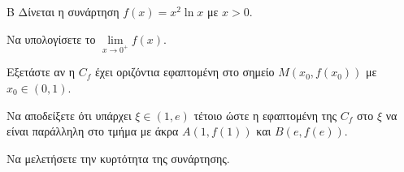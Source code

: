 \begin{thema}{Β}
Δίνεται η συνάρτηση $f(x) = x^2 \ln x$ με $x > 0$.
\begin{erwthma}
\item Να υπολογίσετε το $\lim\limits_{x \to 0^+} f(x)$.
\item Εξετάστε αν η $C_f$ έχει οριζόντια εφαπτομένη στο σημείο $M(x_0,f(x_0))$ με $x_0\in(0,1)$.
\item Να αποδείξετε ότι υπάρχει $\xi \in (1, e)$ τέτοιο ώστε η εφαπτομένη της $C_f$ στο $\xi$ να είναι παράλληλη στο τμήμα με άκρα $A(1, f(1))$ και $B(e, f(e))$.
\item Να μελετήσετε την κυρτότητα της συνάρτησης.
\end{erwthma}
\end{thema}
